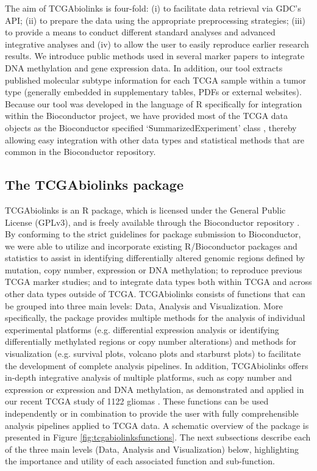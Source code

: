 The aim of TCGAbiolinks is four-fold: (i) to facilitate
data retrieval via GDC’s API; (ii) to prepare the data
using the appropriate preprocessing strategies; (iii) to provide
a means to conduct different standard analyses and
advanced integrative analyses and (iv) to allow the user to
easily reproduce earlier research results.
We introduce public methods
used in several marker papers to integrate DNA methylation
and gene expression data. In addition, our tool extracts
published molecular subtype information for each
TCGA sample within a tumor type (generally embedded in
supplementary tables, PDFs or external websites). Because
our tool was developed in the language of R specifically for integration within the Bioconductor project, we have provided most of the TCGA data objects as the Bioconductor specified
‘SummarizedExperiment’ class \cite{huber2015orchestrating}, thereby allowing easy integration with other data types and statistical
methods that are common in the Bioconductor repository.





\subsection{The TCGAbiolinks package}
TCGAbiolinks is an R package, which is licensed under
the General Public License (GPLv3), and is freely available
through the Bioconductor repository \cite{gentleman2004bioconductor}. By conforming to the strict guidelines for package submission to
Bioconductor, we were able to utilize and incorporate existing R/Bioconductor packages and statistics to assist in identifying differentially altered genomic regions defined by mutation, copy number, expression or DNA methylation; to reproduce previous TCGA marker studies; and to integrate data types both within TCGA and across other data types outside of TCGA. TCGAbiolinks consists of functions that can be grouped into three main levels: Data, Analysis and Visualization. More specifically, the package provides multiple methods for the analysis of individual experimental platforms (e.g. differential expression analysis or identifying
differentially methylated regions or copy number alterations) and methods for visualization (e.g. survival plots, volcano plots and starburst plots) to facilitate the development of complete analysis pipelines. In addition, TCGAbiolinks
offers in-depth integrative analysis of multiple platforms,
such as copy number and expression or expression
and DNA methylation, as demonstrated and applied in our
recent TCGA study of 1122 gliomas \cite{ceccarelli2016molecular}. These functions
can be used independently or in combination to provide the
user with fully comprehensible analysis pipelines applied to
TCGA data. A schematic overview of the package is presented
in Figure \ref{fig:tcgabiolinksfunctions}. The next subsections describe each of the three main levels (Data, Analysis and Visualization) below, highlighting the importance and utility of each associated function and sub-function.


